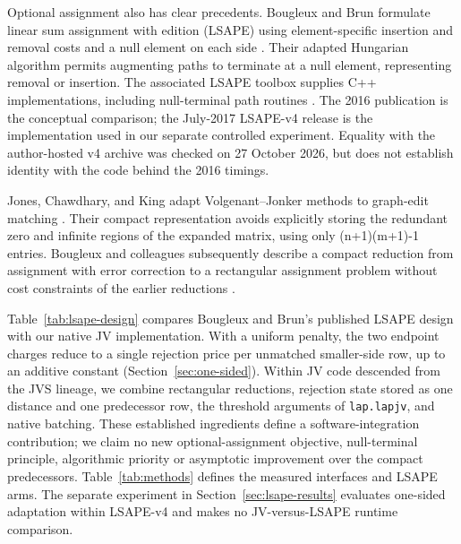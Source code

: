 \documentclass[11pt,a4paper]{article}
\begin{document}
Optional assignment also has clear precedents. Bougleux and Brun formulate linear sum assignment with edition (LSAPE) using element-specific insertion and removal costs and a null element on each side \cite{bougleux2016}. Their adapted Hungarian algorithm permits augmenting paths to terminate at a null element, representing removal or insertion. The associated LSAPE toolbox supplies C++ implementations, including null-terminal path routines \cite{lsape2017}. The 2016 publication is the conceptual comparison; the July-2017 LSAPE-v4 release is the implementation used in our separate controlled experiment. Equality with the author-hosted v4 archive was checked on 27 October 2026, but does not establish identity with the code behind the 2016 timings.

Jones, Chawdhary, and King adapt Volgenant--Jonker methods to graph-edit matching \cite{jones2017}. Their compact representation avoids explicitly storing the redundant zero and infinite regions of the expanded matrix, using only (n+1)(m+1)-1 entries. Bougleux and colleagues subsequently describe a compact reduction from assignment with error correction to a rectangular assignment problem without cost constraints of the earlier reductions \cite{bougleux2020}.

Table~\ref{tab:lsape-design} compares Bougleux and Brun's published LSAPE design with our native JV implementation. With a uniform penalty, the two endpoint charges reduce to a single rejection price per unmatched smaller-side row, up to an additive constant (Section~\ref{sec:one-sided}). Within JV code descended from the JVS lineage, we combine rectangular reductions, rejection state stored as one distance and one predecessor row, the threshold arguments of \texttt{lap.lapjv}, and native batching. These established ingredients define a software-integration contribution; we claim no new optional-assignment objective, null-terminal principle, algorithmic priority or asymptotic improvement over the compact predecessors. Table~\ref{tab:methods} defines the measured interfaces and LSAPE arms. The separate experiment in Section~\ref{sec:lsape-results} evaluates one-sided adaptation within LSAPE-v4 and makes no JV-versus-LSAPE runtime comparison.
\end{document}
